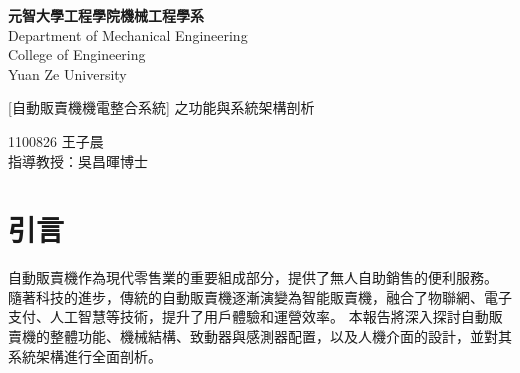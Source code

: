 \documentclass[12pt]{article}       %
\begin{document}
\begin{titlepage}
    \centering
    \vspace*{1cm} %

    {\LARGE \textbf{元智大學工程學院機械工程學系}} \\[0.5cm] %
    {\LARGE {Department of Mechanical Engineering}} \\[0.5cm] %
    {\LARGE {College of Engineering}} \\[0.5cm]
    {\LARGE {Yuan Ze University}}

    \vfill %

    {\LARGE{[自動販賣機機電整合系統] 之功能與系統架構剖析}} %

    \vfill %

    {\LARGE {1100826 王子晨}}\\[4.5cm]
    {\LARGE {指導教授：吳昌暉\hspace{0.5cm}博士}}\\[0.5cm]

\end{titlepage}
\newpage
{}  
\setcounter{page}{1}  %


\begin{center}
    \tableofcontents    %

\end{center}

\newpage  %
\setcounter{page}{1}  %

\section{\centering 引言}
\hspace{2em}自動販賣機作為現代零售業的重要組成部分，提供了無人自助銷售的便利服務。
隨著科技的進步，傳統的自動販賣機逐漸演變為智能販賣機，融合了物聯網、電子支付、人工智慧等技術，提升了用戶體驗和運營效率。
本報告將深入探討自動販賣機的整體功能、機械結構、致動器與感測器配置，以及人機介面的設計，並對其系統架構進行全面剖析。
\end{document}
